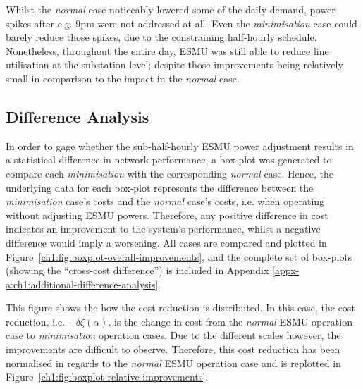 

Whilst the \textit{normal} case noticeably lowered some of the daily demand, power spikes after e.g. 9pm were not addressed at all.
Even the \textit{minimisation} case could barely reduce those spikes, due to the constraining half-hourly schedule.
Nonetheless, throughout the entire day, ESMU was still able to reduce line utilisation at the substation level; despite those improvements being relatively small in comparison to the impact in the \textit{normal} case.

\subsection{Difference Analysis}
\label{ch1:subsec:difference-analysis}

In order to gage whether the sub-half-hourly ESMU power adjustment results in a statistical difference in network performance, a box-plot was generated to compare each \textit{minimisation} with the corresponding \textit{normal} case.
Hence, the underlying data for each box-plot represents the difference between the \textit{minimisation} case's costs and the \textit{normal} case's costs, i.e. when operating without adjusting ESMU powers.
Therefore, any positive difference in cost indicates an improvement to the system's performance, whilst a negative difference would imply a worsening.
All cases are compared and plotted in Figure~\ref{ch1:fig:boxplot-overall-improvements}, and the complete set of box-plots (showing the ``cross-cost difference'') is included in Appendix \ref{appx-a:ch1:additional-difference-analysis}.



This figure shows the how the cost reduction is distributed.
In this case, the cost reduction, i.e. $-\delta\zeta(\alpha)$, is the change in cost from the \textit{normal} ESMU operation case to \textit{minimisation} operation cases.
Due to the different scales however, the improvements are difficult to observe.
Therefore, this cost reduction has been normalised in regards to the \textit{normal} ESMU operation case and is replotted in Figure~\ref{ch1:fig:boxplot-relative-improvements}.



